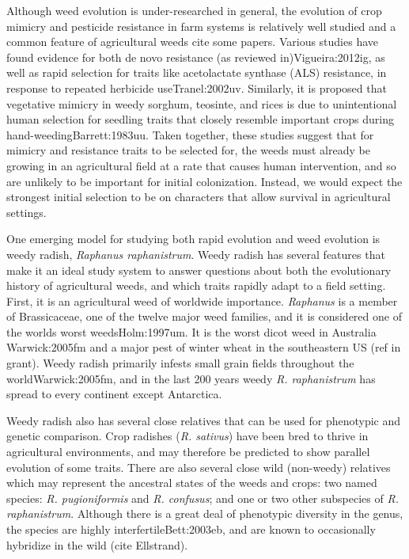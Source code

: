 \documentclass[twocolumn]{bmcart}%
\begin{document}
	Although weed evolution is under-researched in general, the evolution of crop mimicry and pesticide resistance in farm systems is relatively well studied and a common feature of agricultural weeds {cite some papers}. Various studies have found evidence for both de novo resistance (as reviewed in){Vigueira:2012ig}, as well as rapid selection for traits like acetolactate synthase (ALS) resistance, in response to repeated herbicide use{Tranel:2002uv}. Similarly, it is proposed that vegetative mimicry in weedy sorghum, teosinte, and rices is due to unintentional human selection for seedling traits that closely resemble important crops during hand-weeding{Barrett:1983uu}.  Taken together, these studies suggest that for mimicry and resistance traits to be selected for, the weeds must already be growing in an agricultural field at a rate that causes human intervention, and so are unlikely to be important for initial colonization. Instead, we would expect the strongest initial selection to be on characters that allow survival in agricultural settings. 
    
One emerging model for studying both rapid evolution and weed evolution is weedy radish, \textit{Raphanus raphanistrum}. Weedy radish has several features that make it an ideal study system to answer questions about both the evolutionary history of agricultural weeds, and which traits rapidly adapt to a field setting. First, it is an agricultural weed of worldwide importance. \textit{Raphanus} is a member of Brassicaceae, one of the twelve major weed families, and it is considered one of the worlds worst weeds{Holm:1997um}. It is the worst dicot weed in Australia {Warwick:2005fm} and a major pest of winter wheat in the southeastern US (ref in grant). Weedy radish primarily infests small grain fields throughout the world{Warwick:2005fm}, and in the last 200 years weedy \textit{R. raphanistrum} has spread to every continent except Antarctica.

Weedy radish also has several close relatives that can be used for phenotypic and genetic comparison. Crop radishes (\textit{R. sativus}) have been bred to thrive in agricultural environments, and may therefore be predicted to show parallel evolution of some traits. There are also several close wild (non-weedy) relatives which may represent the ancestral states of the weeds and crops: two named species: \textit{R. pugioniformis} and \textit{R. confusus}; and one or two other subspecies of \textit{R. raphanistrum}. Although there is a great deal of phenotypic diversity in the genus, the species are highly interfertile{Bett:2003eb}, and are known to occasionally hybridize in the wild (cite Ellstrand).
\end{document}

